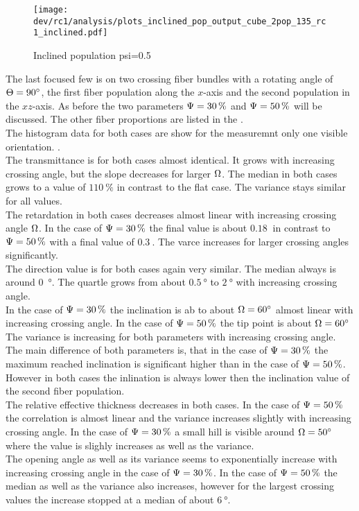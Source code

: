 % 
\begin{figure}[!p]
\centering
\texttt{[image: dev/rc1/analysis/plots\_inclined\_pop\_output\_cube\_2pop\_135\_rc1\_inclined.pdf]}
\caption[]{Inclined population psi=0.5}
\label{fig:inclined_05_fiber_pop_rofl}
\end{figure}
% 
% 
The last focused few is on two crossing fiber bundles with a rotating angle of $\textnormal{$\Theta$} = \SI{90}{\degree}$, \ie{} the first fiber population along the $x$-axis and the second population in the $xz$-axis.
As before the two parameters $\textnormal{$\Psi$} = \SI{30}{\percent}$ and $\textnormal{$\Psi$} = \SI{50}{\percent}$  will be discussed.
The other fiber proportions are listed in the \dummy[appendix]{}.
\\
% 
The histogram data for both cases are show for the measuremnt only one visible orientation.
\dummy{}.
\\
The transmittance is for both cases almost identical.
It grows with increasing crossing angle, but the slope decreases for larger $\textnormal{$\Omega$}$.
The median in both cases grows to a value of $\SI{110}{\percent}$ in contrast to the flat case.
The variance stays similar for all values.
\\
The retardation in both cases decreases almost linear with increasing crossing angle $\textnormal{$\Omega$}$.
In the case of $\textnormal{$\Psi$} = \SI{30}{\percent}$ the final value is about $\SI{0.18}{}$ in contrast to $\textnormal{$\Psi$} = \SI{50}{\percent}$ with a final value of $\SI{0.3}{}$.
The varce increases for larger crossing angles significantly.
\\
The direction value is for both cases again very similar.
The median always is around \SI{0}{\degree}.
The quartle grows from about $\SI{0.5}{\degree}$ to $\SI{2}{\degree}$ with increasing crossing angle.
\\
In the case of $\textnormal{$\Psi$} = \SI{30}{\percent}$ the inclination is ab to about $\textnormal{$\Omega$} =\SI{60}{\degree}$ almost linear with increasing crossing angle.
In the case of $\textnormal{$\Psi$} = \SI{50}{\percent}$ the tip point is about $\textnormal{$\Omega$} = \SI{60}{\degree}$
The variance is increasing for both parameters with increasing crossing angle.
The main difference of both parameters is, that in the case of $\textnormal{$\Psi$} = \SI{30}{\percent}$ the maximum reached inclination is significant higher than in the case of $\textnormal{$\Psi$} = \SI{50}{\percent}$.
However in both cases the inlination is always lower then the inclination value of the second fiber population.
\\
The relative effective thickness \trel{} decreases in both cases.
In the case of $\textnormal{$\Psi$} = \SI{50}{\percent}$ the correlation is almost linear and the variance increases slightly with increasing crossing angle.
In the case of $\textnormal{$\Psi$} = \SI{30}{\percent}$ a small hill is visible around $\textnormal{$\Omega$} = \SI{50}{\degree}$ where the value is slighly increases as well as the variance.
\\
The opening angle as well as its variance seems to exponentially increase with increasing crossing angle in the case of $\textnormal{$\Psi$} = \SI{30}{\percent}$.
In the case of $\textnormal{$\Psi$} = \SI{50}{\percent}$ the median as well as the variance also increases, however for the largest crossing values the increase stopped at a median of about $\SI{6}{\degree}$.
% 
